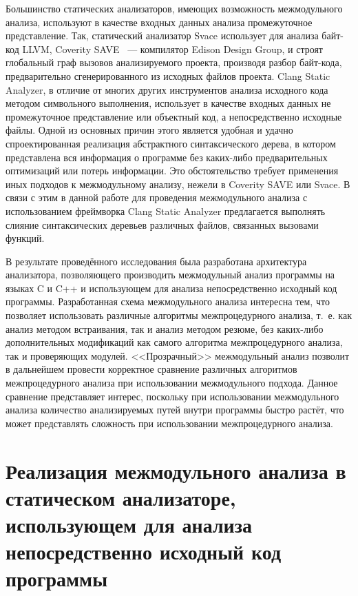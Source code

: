 Большинство статических анализаторов, имеющих возможность межмодульного анализа, используют в качестве входных данных анализа промежуточное представление. Так, статический анализатор Svace \cite{svace} использует для анализа байт-код LLVM, Coverity SAVE \cite{coverity}~--- компилятор Edison Design Group, и строят глобальный граф вызовов анализируемого проекта, производя разбор байт-кода, предварительно сгенерированного из исходных файлов проекта. Clang Static Analyzer, в отличие от многих других инструментов анализа исходного кода методом символьного выполнения, использует в качестве входных данных не промежуточное представление или объектный код, а непосредственно исходные файлы. Одной из основных причин этого является удобная и удачно спроектированная реализация абстрактного синтаксического дерева, в котором представлена вся информация о программе без каких-либо предварительных оптимизаций или потерь информации. Это обстоятельство требует применения иных подходов к межмодульному анализу, нежели в Coverity SAVE или Svace. В связи с этим в данной работе для проведения межмодульного анализа с использованием фреймворка Clang Static Analyzer предлагается  выполнять слияние синтаксических деревьев различных файлов, связанных вызовами функций.

В результате проведённого исследования была разработана архитектура анализатора, позволяющего производить межмодульный анализ программы на языках C и C++ и использующем для анализа непосредственно исходный код программы. Разработанная схема межмодульного анализа интересна тем, что позволяет использовать различные алгоритмы межпроцедурного анализа, т.~е. как анализ методом встраивания, так и анализ методом резюме, без каких-либо дополнительных модификаций как самого алгоритма межпроцедурного анализа, так и проверяющих модулей. <<Прозрачный>> межмодульный анализ позволит в дальнейшем провести корректное сравнение различных алгоритмов межпроцедурного анализа при использовании межмодульного подхода. Данное сравнение представляет интерес, поскольку при использовании межмодульного анализа количество анализируемых путей внутри программы быстро растёт, что может представлять сложность при использовании межпроцедурного анализа.

\section{Реализация межмодульного анализа в статическом анализаторе, использующем для анализа непосредственно исходный код программы}

